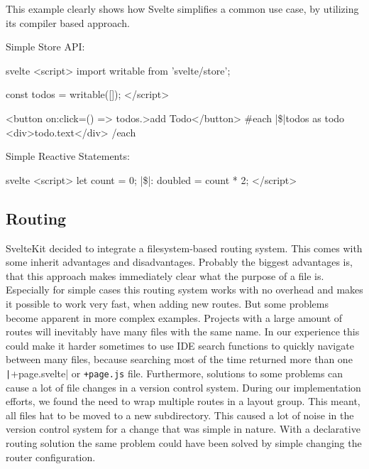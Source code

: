 This example clearly shows how Svelte simplifies a common use case, by utilizing its compiler based approach.

\todo{}

Simple Store API:
\begin{myminted}[escapeinside=||]{svelte}{}
<script>
    import { writable } from 'svelte/store';

    const todos = writable([]);
</script>

<button on:click={() => todos.}>add Todo</button>
{#each |\$|todos as todo}
    <div>{todo.text}</div>
{/each}
\end{myminted}

Simple Reactive Statements:
\begin{myminted}[escapeinside=||]{svelte}{}
<script>
    let count = 0;
    |\$|: doubled = count * 2;
</script>
\end{myminted}





\subsection{Routing}
SvelteKit decided to integrate a filesystem-based routing system. This comes with some inherit advantages and disadvantages. Probably the biggest advantages is, that this approach makes immediately clear what the purpose of a file is. Especially for simple cases this routing system works with no overhead and makes it possible to work very fast, when adding new routes. But some problems become apparent in more complex examples. Projects with a large amount of routes will inevitably have many files with the same name. In our experience this could make it harder sometimes to use IDE search functions to quickly navigate between many files, because searching most of the time returned more than one \texttt|+page.svelte| or \texttt{+page.js} file. Furthermore, solutions to some problems can cause a lot of file changes in a version control system. During our implementation efforts, we found the need to wrap multiple routes in a layout group. This meant, all files hat to be moved to a new subdirectory. This caused a lot of noise in the version control system for a change that was simple in nature. With a declarative routing solution the same problem could have been solved by simple changing the router configuration.

